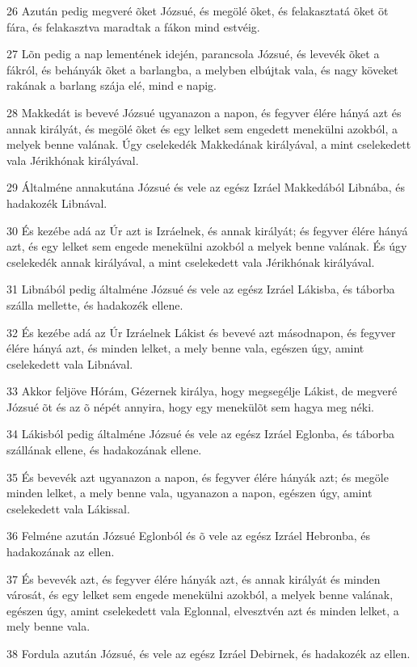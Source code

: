 \par 26 Azután pedig megveré õket Józsué, és megölé õket, és felakasztatá õket öt fára, és felakasztva maradtak a fákon mind estvéig.
\par 27 Lõn pedig a nap lementének idején, parancsola Józsué, és levevék õket a fákról,  és behányák õket a barlangba, a melyben elbújtak vala, és nagy köveket rakának a barlang szája elé, mind e napig.
\par 28 Makkedát is bevevé Józsué ugyanazon a napon, és fegyver élére hányá azt és annak királyát, és megölé õket és egy lelket sem engedett menekülni azokból, a melyek benne valának. Úgy cselekedék Makkedának királyával, a mint cselekedett vala Jérikhónak királyával.
\par 29 Általméne annakutána Józsué és vele az egész Izráel Makkedából Libnába, és hadakozék Libnával.
\par 30 És kezébe adá az Úr azt is Izráelnek, és annak királyát; és fegyver élére hányá azt, és egy lelket sem engede menekülni azokból a melyek benne valának. És úgy cselekedék annak királyával, a mint cselekedett vala Jérikhónak királyával.
\par 31 Libnából pedig általméne Józsué és vele az egész Izráel Lákisba, és táborba szálla mellette, és hadakozék ellene.
\par 32 És kezébe adá az Úr Izráelnek Lákist és bevevé azt másodnapon, és fegyver élére hányá azt, és minden lelket, a mely benne vala, egészen úgy, amint cselekedett vala Libnával.
\par 33 Akkor feljöve Hórám, Gézernek királya, hogy megsegélje Lákist, de megveré Józsué õt és az õ népét annyira, hogy egy menekülõt sem hagya meg néki.
\par 34 Lákisból pedig általméne Józsué és vele az egész Izráel Eglonba, és táborba szállának ellene, és hadakozának ellene.
\par 35 És bevevék azt ugyanazon a napon, és fegyver élére hányák azt; és megöle minden lelket, a mely benne vala, ugyanazon a napon, egészen úgy, amint cselekedett vala Lákissal.
\par 36 Felméne azután Józsué Eglonból és õ vele az egész Izráel Hebronba, és hadakozának az ellen.
\par 37 És bevevék azt, és fegyver élére hányák azt, és annak királyát és minden városát, és egy lelket sem engede menekülni azokból, a melyek benne valának, egészen úgy, amint cselekedett vala Eglonnal, elvesztvén azt és minden lelket, a mely benne vala.
\par 38 Fordula azután Józsué, és vele az egész Izráel Debirnek, és hadakozék az ellen.
